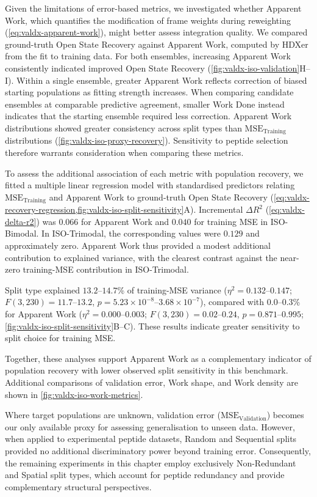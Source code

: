 Given the limitations of error-based metrics, we investigated whether Apparent Work, which quantifies the modification of frame weights during reweighting (\cref{eq:valdx-apparent-work}), might better assess integration quality. We compared ground-truth Open State Recovery against Apparent Work, computed by HDXer from the fit to training data. For both ensembles, increasing Apparent Work consistently indicated improved Open State Recovery (\cref{fig:valdx-iso-validation}H--I). Within a single ensemble, greater Apparent Work reflects correction of biased starting populations as fitting strength increases. When comparing candidate ensembles at comparable predictive agreement, smaller Work Done instead indicates that the starting ensemble required less correction. Apparent Work distributions showed greater consistency across split types than $\text{MSE}_\text{Training}$ distributions (\cref{fig:valdx-iso-proxy-recovery}). Sensitivity to peptide selection therefore warrants consideration when comparing these metrics.

To assess the additional association of each metric with population recovery, we fitted a multiple linear regression model with standardised predictors relating $\text{MSE}_\text{Training}$ and Apparent Work to ground-truth Open State Recovery (\cref{eq:valdx-recovery-regression,fig:valdx-iso-split-sensitivity}A). Incremental $\Delta R^2$ (\cref{eq:valdx-delta-r2}) was $0.066$ for Apparent Work and $0.040$ for training MSE in ISO-Bimodal. In ISO-Trimodal, the corresponding values were $0.129$ and approximately zero. Apparent Work thus provided a modest additional contribution to explained variance, with the clearest contrast against the near-zero training-MSE contribution in ISO-Trimodal.

Split type explained $13.2$--$14.7$\% of training-MSE variance ($\eta^2=0.132$--$0.147$; $F(3,230)=11.7$--$13.2$, $p=5.23\times10^{-8}$--$3.68\times10^{-7}$), compared with $0.0$--$0.3$\% for Apparent Work ($\eta^2=0.000$--$0.003$; $F(3,230)=0.02$--$0.24$, $p=0.871$--$0.995$; \cref{fig:valdx-iso-split-sensitivity}B--C). These results indicate greater sensitivity to split choice for training MSE.

Together, these analyses support Apparent Work as a complementary indicator of population recovery with lower observed split sensitivity in this benchmark. Additional comparisons of validation error, Work shape, and Work density are shown in \cref{fig:valdx-iso-work-metrics}.

Where target populations are unknown, validation error ($\text{MSE}_\text{Validation}$) becomes our only available proxy for assessing generalisation to unseen data. However, when applied to experimental peptide datasets, Random and Sequential splits provided no additional discriminatory power beyond training error. Consequently, the remaining experiments in this chapter employ exclusively Non-Redundant and Spatial split types, which account for peptide redundancy and provide complementary structural perspectives.

